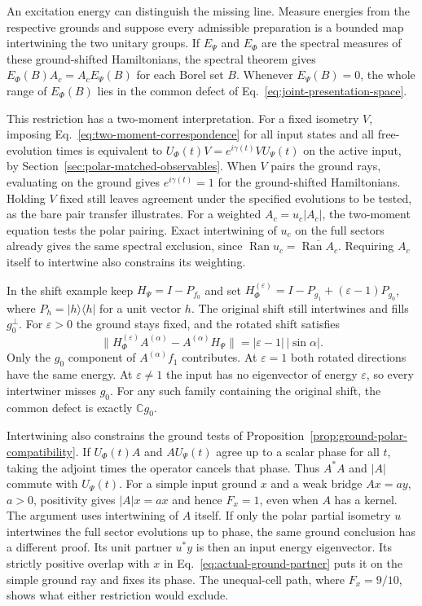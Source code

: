 \documentclass[11pt]{article}
\theoremstyle{definition}
\DeclareMathOperator{\Ran}{Ran}
\newcommand{\C}{\mathbb C}
\newcommand{\ket}[1]{\lvert #1\rangle}
\newcommand{\bra}[1]{\langle #1\rvert}
\begin{document}
An excitation energy can distinguish the missing line. Measure energies from the respective grounds and suppose every admissible preparation is a bounded map intertwining the two unitary groups. If $E_\Psi$ and $E_\Phi$ are the spectral measures of these ground-shifted Hamiltonians, the spectral theorem gives $E_\Phi(B)A_c=A_cE_\Psi(B)$ for each Borel set $B$. Whenever $E_\Psi(B)=0$, the whole range of $E_\Phi(B)$ lies in the common defect of Eq.~\eqref{eq:joint-presentation-space}.

This restriction has a two-moment interpretation. For a fixed isometry $V$, imposing Eq.~\eqref{eq:two-moment-correspondence} for all input states and all free-evolution times is equivalent to $U_\Phi(t)V=e^{i\gamma(t)}VU_\Psi(t)$ on the active input, by Section~\ref{sec:polar-matched-observables}. When $V$ pairs the ground rays, evaluating on the ground gives $e^{i\gamma(t)}=1$ for the ground-shifted Hamiltonians. Holding $V$ fixed still leaves agreement under the specified evolutions to be tested, as the bare pair transfer illustrates. For a weighted $A_c=u_c|A_c|$, the two-moment equation tests the polar pairing. Exact intertwining of $u_c$ on the full sectors already gives the same spectral exclusion, since $\Ran u_c=\overline{\Ran A_c}$. Requiring $A_c$ itself to intertwine also constrains its weighting.

In the shift example keep $H_\Psi=I-P_{f_0}$ and set $H_\Phi^{(\varepsilon)}=I-P_{g_1}+(\varepsilon-1)P_{g_0}$, where $P_h=\ket{h}\bra{h}$ for a unit vector $h$. The original shift still intertwines and fills $g_0^\perp$. For $\varepsilon>0$ the ground stays fixed, and the rotated shift satisfies
\begin{equation}
 \bigl\|H_\Phi^{(\varepsilon)} A^{(\alpha)}-A^{(\alpha)}H_\Psi\bigr\|
       =|\varepsilon-1|\,|\sin\alpha| .
 \label{eq:index-shift-energy}
\end{equation}
Only the $g_0$ component of $A^{(\alpha)}f_1$ contributes. At $\varepsilon=1$ both rotated directions have the same energy. At $\varepsilon\ne1$ the input has no eigenvector of energy $\varepsilon$, so every intertwiner misses $g_0$. For any such family containing the original shift, the common defect is exactly $\C g_0$.

Intertwining also constrains the ground tests of Proposition~\ref{prop:ground-polar-compatibility}. If $U_\Phi(t)A$ and $AU_\Psi(t)$ agree up to a scalar phase for all $t$, taking the adjoint times the operator cancels that phase. Thus $A^*A$ and $|A|$ commute with $U_\Psi(t)$. For a simple input ground $x$ and a weak bridge $Ax=ay$, $a>0$, positivity gives $|A|x=ax$ and hence $F_x=1$, even when $A$ has a kernel. The argument uses intertwining of $A$ itself. If only the polar partial isometry $u$ intertwines the full sector evolutions up to phase, the same ground conclusion has a different proof. Its unit partner $u^*y$ is then an input energy eigenvector. Its strictly positive overlap with $x$ in Eq.~\eqref{eq:actual-ground-partner} puts it on the simple ground ray and fixes its phase. The unequal-cell path, where $F_x=9/10$, shows what either restriction would exclude.
\end{document}
